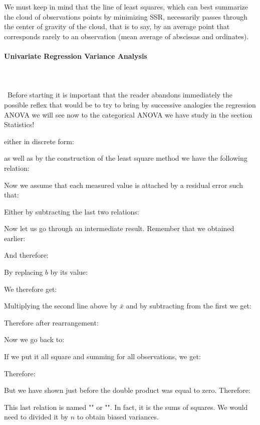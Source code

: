 	\begin{tcolorbox}[title=Remark,colframe=black,arc=10pt]
We must keep in mind that the line of least squares, which can best summarize the cloud of observations points by minimizing SSR, necessarily passes through the center of gravity of the cloud, that is to say, by an average point that corresponds rarely to an observation (mean average of abscissas and ordinates).
	\end{tcolorbox}
	
	\pagebreak
	\paragraph{Univariate Regression Variance Analysis}\mbox{}\\\\\
	Before starting it is important that the reader abandons immediately the possible reflex that would be to try to bring by successive analogies the regression ANOVA we will see now to the categorical ANOVA we have study in the section Statistics!
	
	either in discrete form:
	
	as well as by the construction of the least square method we have the following relation:
	
	Now we assume that each measured value is attached by a residual error such that:
	
	Either by subtracting the last two relations:
	
	Now let us go through an intermediate result. Remember that we obtained earlier:
	
	And therefore:
	
	By replacing $b$ by its value:
	
	We therefore get:
	
	Multiplying the second line above by $\bar{x}$ and by subtracting from the first we get:
	
	Therefore after rearrangement:
	
	Now we go back to:
	
	If we put it all square and summing for all observations, we get:
	
	Therefore:
	
	But we have shown just before the double product was equal to zero. Therefore:
	
	This last relation is named "" or "". In fact, it is the sums of squares. We would need to divided it by $n$ to obtain biased variances.
	
